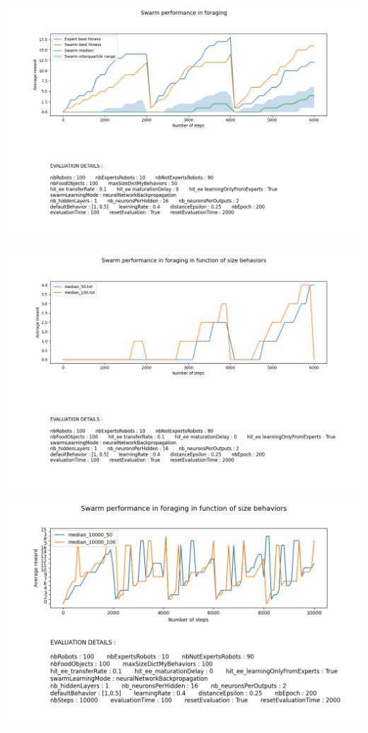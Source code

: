 \documentclass[a4paper, 12pt]{report}
\begin{document}
    \includegraphics[scale=0.5]{bp6000_50.png}

    \includegraphics[scale=0.5]{sizeDB_50vs100_bp.png}
    
    \includegraphics[scale=0.5]{images/data_sizeDB_10000_bp.png}
\end{document}
